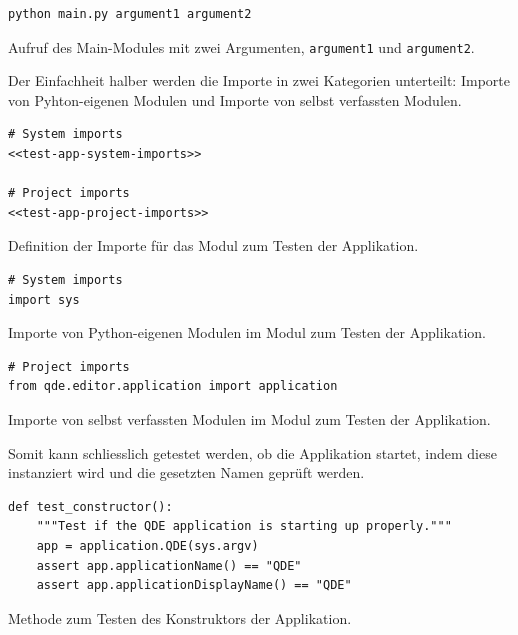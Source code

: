 \documentclass[10pt, openright, notitlepage]{scrreprt}
\begin{document}
\begin{listing}[H]
\begin{verbatim}
python main.py argument1 argument2
\end{verbatim}
\caption{\label{fig:impl-python-call-arguments}
Aufruf des Main-Modules mit zwei Argumenten, \texttt{argument1} und \texttt{argument2}.}
\end{listing}

Der Einfachheit halber werden die Importe in zwei Kategorien unterteilt: Importe
von Pyhton-eigenen Modulen und Importe von selbst verfassten Modulen.

\begin{listing}[H]
\begin{verbatim}
# System imports
<<test-app-system-imports>>

# Project imports
<<test-app-project-imports>>
\end{verbatim}
\caption{\label{test-app-imports}
Definition der Importe für das Modul zum Testen der Applikation.}
\end{listing}

\begin{listing}[H]
\begin{verbatim}
# System imports
import sys
\end{verbatim}
\caption{Importe von Python-eigenen Modulen im Modul zum Testen der Applikation.}
\end{listing}

\begin{listing}[H]
\begin{verbatim}
# Project imports
from qde.editor.application import application
\end{verbatim}
\caption{\label{test-app-project-imports}
Importe von selbst verfassten Modulen im Modul zum Testen der Applikation.}
\end{listing}

Somit kann schliesslich getestet werden, ob die Applikation startet, indem diese
instanziert wird und die gesetzten Namen geprüft werden.

\begin{listing}[H]
\begin{verbatim}
def test_constructor():
    """Test if the QDE application is starting up properly."""
    app = application.QDE(sys.argv)
    assert app.applicationName() == "QDE"
    assert app.applicationDisplayName() == "QDE"
\end{verbatim}
\caption{\label{test-app-test-constructor}
Methode zum Testen des Konstruktors der Applikation.}
\end{listing}
\end{document}
